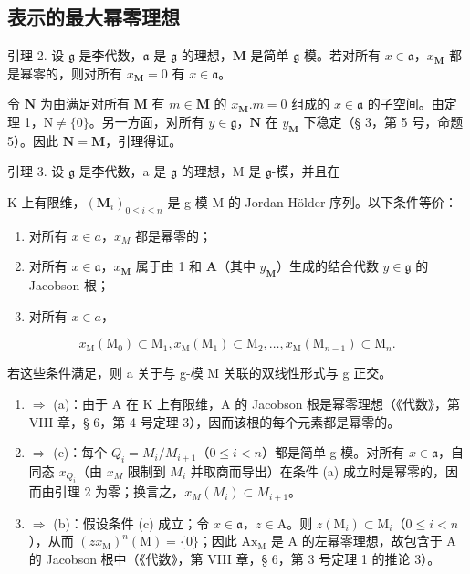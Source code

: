 \subsection{表示的最大幂零理想}

引理 2. 设 \(\mathfrak{g}\) 是李代数，\(\mathfrak{a}\) 是 \(\mathfrak{g}\) 的理想，\(\mathbf{M}\) 是简单 \(\mathfrak{g}\)-模。若对所有 \(x \in \mathfrak{a}\)，\(x_{\mathbf{M}}\) 都是幂零的，则对所有 \(x_{\mathbf{M}} = 0\) 有 \(x \in \mathfrak{a}\)。

令 \(\mathbf{N}\) 为由满足对所有 \(\mathbf{M}\) 有 \(m \in \mathbf{M}\) 的 \(x_{\mathbf{M}}.m = 0\) 组成的 \(x \in \mathfrak{a}\) 的子空间。由定理 1，\(\mathrm{N} \neq \{0\}\)。另一方面，对所有 \(y \in \mathfrak{g}\)，\(\mathbf{N}\) 在 \(y_{\mathbf{M}}\) 下稳定（§ 3，第 5 号，命题 5）。因此 \(\mathbf{N} = \mathbf{M}\)，引理得证。

引理 3. 设 \(\mathfrak{g}\) 是李代数，a 是 \(\mathfrak{g}\) 的理想，M 是 \(\mathfrak{g}\)-模，并且在

K 上有限维，\((\mathbf{M}_{i})_{0\leqslant i\leqslant n}\) 是 g-模 M 的 Jordan-Hölder 序列。以下条件等价：

\begin{enumerate}
\def\labelenumi{(\alph{enumi})}
\item
  对所有 \(x \in a\)，\(x_{M}\) 都是幂零的；
\item
  对所有 \(x \in \mathfrak{a}\)，\(x_{\mathbf{M}}\) 属于由 1 和 \(\mathbf{A}\)（其中 \(y_{\mathbf{M}}\)）生成的结合代数 \(y \in \mathfrak{g}\) 的 Jacobson 根；
\item
  对所有 \(x \in a\)，
\end{enumerate}

\[
x _ {\mathrm{M}} \left(\mathrm{M} _ {0}\right) \subset \mathrm{M} _ {1}, x _ {\mathrm{M}} \left(\mathrm{M} _ {1}\right) \subset \mathrm{M} _ {2}, \dots , x _ {\mathrm{M}} \left(\mathrm{M} _ {n - 1}\right) \subset \mathrm{M} _ {n}.
\]

若这些条件满足，则 a 关于与 g-模 M 关联的双线性形式与 g 正交。

\begin{enumerate}
\def\labelenumi{(\alph{enumi})}
\setcounter{enumi}{1}
\item
  \(\Rightarrow\) (a)：由于 A 在 K 上有限维，A 的 Jacobson 根是幂零理想（《代数》，第 VIII 章，§ 6，第 4 号定理 3），因而该根的每个元素都是幂零的。
\item
  \(\Rightarrow\) (c)：每个 \(Q_{i} = M_{i}/M_{i+1}\)（\(0 \leqslant i < n\)）都是简单 g-模。对所有 \(x \in \mathfrak{a}\)，自同态 \(x_{Q_{i}}\)（由 \(x_{M}\) 限制到 \(M_{i}\) 并取商而导出）在条件 (a) 成立时是幂零的，因而由引理 2 为零；换言之，\(x_{M}(M_{i}) \subset M_{i+1}\)。
\item
  \(\Rightarrow\) (b)：假设条件 (c) 成立；令 \(x\in\mathfrak{a}\)，\(z\in\mathrm{A}\)。则 \(z(\mathrm{M}_{i})\subset\mathrm{M}_{i}\)（\(0\leqslant i<n\)），从而 \((zx_{\mathrm{M}})^{n}(\mathrm{M})=\{0\}\)；因此 \(\mathrm{Ax}_{\mathrm{M}}\) 是 A 的左幂零理想，故包含于 A 的 Jacobson 根中（《代数》，第 VIII 章，§ 6，第 3 号定理 1 的推论 3）。
\end{enumerate}

